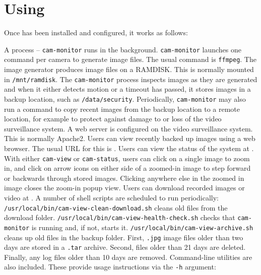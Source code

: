 \clearpage
\section{Using \PRODUCT{}}

  Once \PRODUCT{} has been installed and configured, it works as follows:

  \BE
  \I A process -- \texttt{cam-monitor} runs in the background.
  \I \texttt{cam-monitor} launches one command per camera to generate
     image files.  The usual command is \texttt{ffmpeg}.
  \I The image generator produces image files on a RAMDISK.  This is
     normally mounted in \texttt{/mnt/ramdisk}.
  \I The \texttt{cam-monitor} process inspects images as they are
     generated and when it either detects motion or a timeout
     has passed, it stores images in a backup location, such as
     \texttt{/data/security}.
  \I Periodically, \texttt{cam-monitor} may also run a command to
     copy recent images from the backup location to a remote
     location, for example to protect against damage to or loss of
     the video surveillance system.
  \I A web server is configured on the video surveillance system.
     This is normally Apache2.
  \I Users can view recently backed up images using a web browser.
     The usual URL for this is .
  \I Users can view the status of the system at
     .
  \I With either \texttt{cam-view} or \texttt{cam-status}, users can 
     click on a single image to zoom in, and click on arrow icons on
     either side of a zoomed-in image to step forward or backwards
     through stored images.  Clicking anywhere else in the zoomed in
     image closes the zoom-in popup view.
  \I Users can download recorded images or video at
     .
  \I A number of shell scripts are scheduled to run periodically:
     \BI
     \I \texttt{/usr/local/bin/cam-view-clean-download.sh} cleans
        old files from the download folder.
     \I \texttt{/usr/local/bin/cam-view-health-check.sh} checks
        that \texttt{cam-monitor} is running and, if not, starts it.
     \I \texttt{/usr/local/bin/cam-view-archive.sh} cleans up old
        files in the backup folder.  First, \texttt{.jpg} image 
        files older than two days are stored in a \texttt{.tar}
        archive.  Second, files older than 21 days are deleted.
        Finally, any log files older than 10 days are removed.
     \EI
  \I Command-line utilities are also included.  These
     provide usage instructions via the \texttt{-h} argument:
